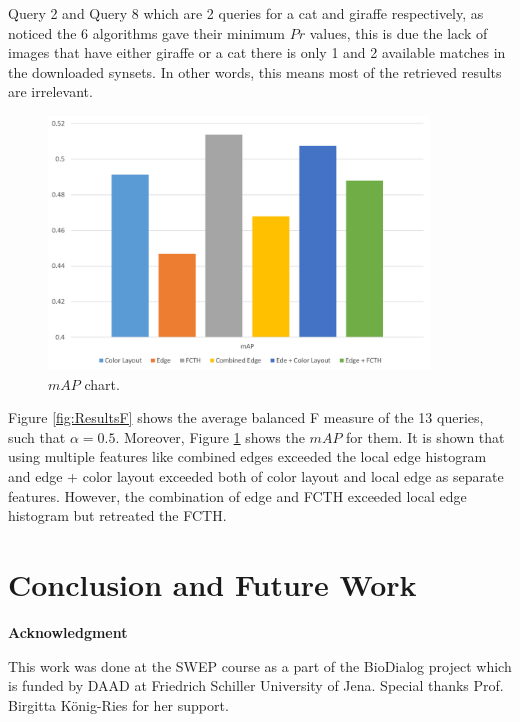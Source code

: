 \documentclass[11pt]{article}
\begin{document}
Query 2 and Query 8 which are 2 queries for a cat and giraffe respectively, as noticed the 6  algorithms gave their minimum $Pr$ values, this is due the lack of images that have either giraffe or a cat there is only 1 and 2 available matches in the downloaded synsets. In other words, this means most of the retrieved results are irrelevant.

\begin{figure}[th]
\centering
\includegraphics[width=0.9\textwidth]{mAP}
\caption{ $mAP$ chart.}
\label{fig:mAP}
\end{figure}

Figure \ref{fig:ResultsF} shows the average balanced F measure of the 13 queries, such that $\alpha = 0.5$. Moreover, Figure \ref{fig:mAP} shows the $mAP$ for them. It is shown that  using multiple features like combined edges exceeded the local edge histogram and edge + color layout exceeded both of color layout and local edge as  separate features. However, the combination of edge and FCTH exceeded local edge histogram but retreated the FCTH.

\section{Conclusion and Future Work}




\begin{Large}
\textbf{Acknowledgment}
\end{Large}

This work was done at the SWEP course as a part of the BioDialog project which is funded by DAAD at Friedrich Schiller University of Jena. Special thanks Prof.
Birgitta König-Ries for her support.



\end{document}
